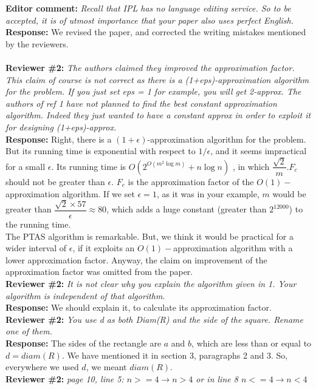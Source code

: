 \documentclass[review]{elsarticle}
\begin{document}
\textbf{Editor comment:} \textit{Recall that IPL has no language editing service. So to be accepted, it is of utmost importance that your paper also uses perfect English.} \\
\textbf{Response:} We revised the paper, and corrected the writing mistakes mentioned by the reviewers.\\
\\
\textbf{Reviewer \#2:} \textit{The authors claimed they improved the approximation factor. This claim of course is not correct as there is a (1+eps)-approximation algorithm for the problem. If you just set eps = 1 for example, you will get 2-approx.
The authors of ref 1 have not planned to find the best constant approximation algorithm. Indeed they just wanted to have a constant approx in order to exploit it for designing (1+eps)-approx.}\\
\textbf{Response:} Right, there is a $(1+\epsilon)$-approximation algorithm for the problem. But its running time is exponential with respect to $1/\epsilon$, and it seems impractical for a small $\epsilon$. Its running time is $O(2^{O(m^2\log m)}+n\log n)$ \cite[Theorem 27]{Arkin2006}, in which $\dfrac{\sqrt{2}}{m}.F_c$ should not be greater than $\epsilon$. $F_c$ is the approximation factor of the $O(1)-$approximation algorithm. If we set $\epsilon=1$, as it was in your example, $m$ would be greater than $\dfrac{\sqrt{2}\times 57}{\epsilon}\approx 80$, which adds a huge constant (greater than $2^{12000}$) to the running time. \\
The PTAS algorithm is remarkable. But, we think it would be practical for a wider interval of $\epsilon$, if it exploits an $O(1)-$approximation algorithm with a lower approximation factor. Anyway, the claim on improvement of the approximation factor was omitted from the paper.
\\
\textbf{Reviewer \#2:} \textit{It is not clear why you explain the algorithm given in 1. Your algorithm is independent of that algorithm.}\\
\textbf{Response:} We should explain it, to calculate its approximation factor.
\\
\textbf{Reviewer \#2:} \textit{You use d as both Diam(R) and the side of the square. Rename one of them.}\\
\textbf{Response:} The sides of the rectangle are $a$ and $b$, which are less than or equal to $d=diam(R)$. We have mentioned it in section 3, paragraphs 2 and 3. So, everywhere we used $d$, we meant $diam(R)$.
\\
\textbf{Reviewer \#2:} \textit{page 10, line 5: $n >= 4 \rightarrow n> 4$ or in line 8 $n <= 4 \rightarrow n < 4$}\\
\end{document}
